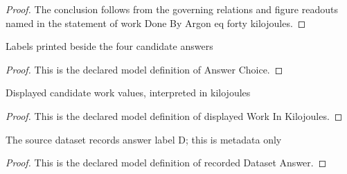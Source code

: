 \begin{proof}
  The conclusion follows from the governing relations and figure readouts named in the statement of work Done By Argon eq forty kilojoules.
\end{proof}
\begin{definition}
  \label{def:physics:phyx-mini-0449:phyxminiproblems-problemphyxmini0449-answerchoice}
  Labels printed beside the four candidate answers
\end{definition}
\begin{proof}
  This is the declared model definition of Answer Choice.
\end{proof}
\begin{definition}
  \label{def:physics:phyx-mini-0449:phyxminiproblems-problemphyxmini0449-displayedworkinkilojoules}
  Displayed candidate work values, interpreted in kilojoules
\end{definition}
\begin{proof}
  This is the declared model definition of displayed Work In Kilojoules.
\end{proof}
\begin{definition}
  \label{def:physics:phyx-mini-0449:phyxminiproblems-problemphyxmini0449-recordeddatasetanswer}
  The source dataset records answer label D; this is metadata only
\end{definition}
\begin{proof}
  This is the declared model definition of recorded Dataset Answer.
\end{proof}
